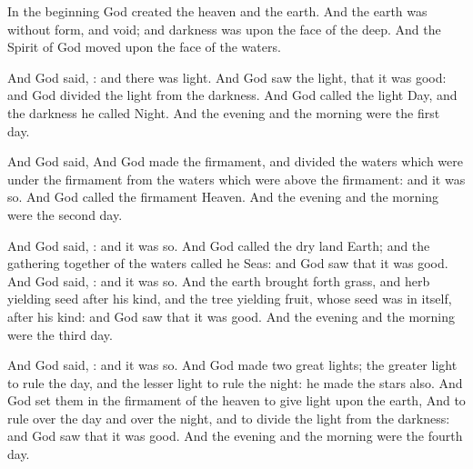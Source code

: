 
\Chapter[name = In The Beginning]
\Verse In the beginning God created the heaven and the earth.  
\Verse And the earth was without form, and void; and darkness was upon the face of the deep.  And the Spirit of God moved upon the face of the waters.

\Verse And God said, : and there was light.  
\Verse And God saw the light, that it was good: and God divided the light from the darkness.  
\Verse And God called the light Day, and the darkness he called Night.  And the evening and the morning were the first day.

\Verse And God said, 
\Verse And God made the firmament, and divided the waters which were under the firmament from the waters which were above the firmament: and it was so.  
\Verse And God called the firmament Heaven.  And the evening and the morning were the second day.

\Verse And God said, : and it was so.  
\Verse And God called the dry land Earth; and the gathering together of the waters called he Seas: and God saw that it was good.  
\Verse And God said, : and it was so.  
\Verse And the earth brought forth grass, and herb yielding seed after his kind, and the tree yielding fruit, whose seed was in itself, after his kind: and God saw that it was good.  
\Verse And the evening and the morning were the third day.

\Verse And God said, : and it was so.  
\Verse And God made two great lights; the greater light to rule the day, and the lesser light to rule the night: he made the stars also.  
\Verse And God set them in the firmament of the heaven to give light upon the earth, 
\Verse And to rule over the day and over the night, and to divide the light from the darkness: and God saw that it was good.  
\Verse And the evening and the morning were the fourth day.

